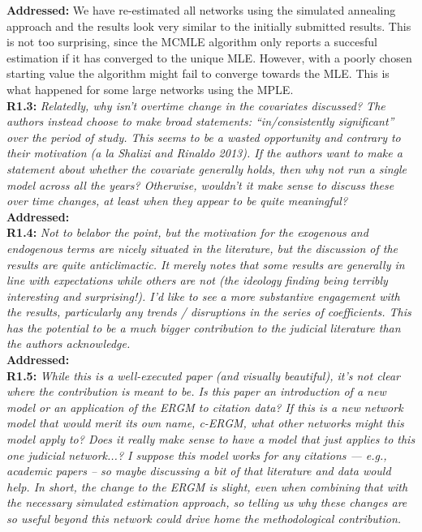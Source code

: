 \documentclass[a4paper,11pt]{texMemo}
\begin{document}
\noindent \textbf{Addressed:} We have re-estimated all networks using the simulated annealing approach and the results look very similar to the initially submitted results. This is not too surprising, since the MCMLE algorithm only reports a succesful estimation if it has converged to the unique MLE. However, with a poorly chosen starting value the algorithm might fail to converge towards the MLE. This is what happened for some large networks using the MPLE.  \\

\noindent \textbf{R1.3:} \emph{ Relatedly, why isn’t overtime change in the covariates discussed? The authors instead choose to make broad statements: “in/consistently significant” over the period of study.  This seems to be a wasted opportunity and contrary to their motivation (a la Shalizi and Rinaldo 2013). If the authors want to make a statement about whether the covariate generally holds, then why not run a single model across all the years? Otherwise, wouldn’t it make sense to discuss these over time changes, at least when they appear to be quite meaningful?  }\\

\noindent \textbf{Addressed:}   \\

\noindent \textbf{R1.4:} \emph{ Not to belabor the point, but the motivation for the exogenous and endogenous terms are nicely situated in the literature, but the discussion of the results are quite anticlimactic. It merely notes that some results are generally in line with expectations while others are not (the ideology finding being terribly interesting and surprising!). I’d like to see a more substantive engagement with the results, particularly any trends / disruptions in the series of coefficients. This has the potential to be a much bigger contribution to the judicial literature than the authors acknowledge.  }\\

\noindent \textbf{Addressed:}   \\


\noindent \textbf{R1.5:} \emph{ While this is a well-executed paper (and visually beautiful), it’s not clear where the contribution is meant to be. Is this paper an introduction of a new model or an application of the ERGM to citation data?  If this is a new network model that would merit its own name, c-ERGM, what other networks might this model apply to?  Does it really make sense to have a model that just applies to this one judicial network...? I suppose this model works for any citations --- e.g., academic papers -- so maybe discussing a bit of that literature and data would help. In short, the change to the ERGM is slight, even when combining that with the necessary simulated estimation approach, so telling us why these changes are so useful beyond this network could drive home the methodological contribution.  }\\
\end{document}
